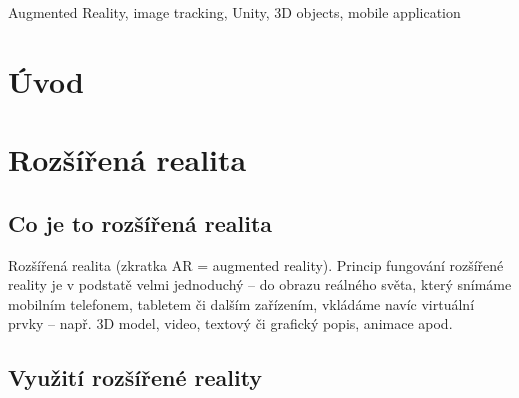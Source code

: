 \documentclass[12pt, a4paper,
twoside,        %
openright
]{report}
\begin{document}
	
	\noindent  %
	
	\vspace{18pt}
	
	
	\noindent Augmented Reality, image tracking, Unity, 3D objects, mobile application
	
	\clearpage %

	
	\tableofcontents %

	\setcounter{page}{1} %

	\chapter*{Úvod}




 


\chapter{Rozšířená realita}

\section{Co je to rozšířená realita}
\label{sec:co_je_AR}
Rozšířená realita (zkratka AR = augmented reality). Princip fungování rozšířené reality je v podstatě velmi jednoduchý – do obrazu reálného světa, který snímáme mobilním telefonem, tabletem či dalším zařízením, vkládáme navíc virtuální prvky – např. 3D model, video, textový či grafický popis, animace apod.


\section{Využití rozšířené reality}
\label{sec:vyuziti_AR}
\end{document}
